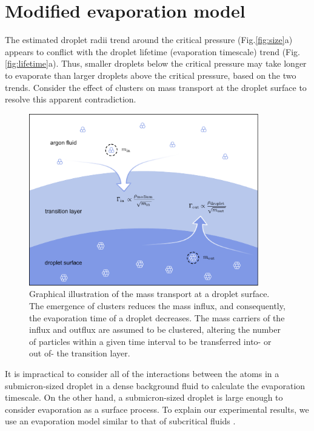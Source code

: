 \section{Modified evaporation model}
\label{sec:ch2-5}

The estimated droplet radii trend around the critical pressure (Fig.\ref{fig:size}a) appears to conflict with the droplet lifetime (evaporation timescale) trend (Fig.\ref{fig:lifetime}a). Thus, smaller droplets below the critical pressure may take longer to evaporate than larger droplets above the critical pressure, based on the two trends. Consider the effect of clusters on mass transport at the droplet surface to resolve this apparent contradiction.

\begin{figure}[t!]
\centering
\includegraphics[width=100mm]{figures/ch2/transport/evaporation.pdf}
\caption{Graphical illustration of the mass transport at a droplet surface. The emergence of clusters reduces the mass influx, and consequently, the evaporation time of a droplet decreases. The mass carriers of the influx and outflux are assumed to be clustered, altering the number of particles within a given time interval to be transferred into- or out of- the transition layer.}
\label{fig:evaporation}
\end{figure}

It is impractical to consider all of the interactions between the atoms in a submicron-sized droplet in a dense background fluid to calculate the evaporation timescale. On the other hand, a submicron-sized droplet is large enough to consider evaporation as a surface process. To explain our experimental results, we use an evaporation model similar to that of subcritical fluids \cite{ishiyama2004molecular, julin2013mass}.

